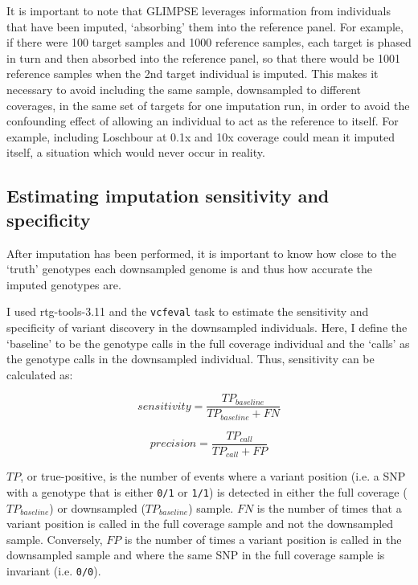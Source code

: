 It is important to note that GLIMPSE leverages information from individuals that have been imputed, `absorbing' them into the reference panel. For example, if there were 100 target samples and 1000 reference samples, each target is phased in turn and then absorbed into the reference panel, so that there would be 1001 reference samples when the 2nd target individual is imputed. This makes it necessary to avoid including the same sample, downsampled to different coverages, in the same set of targets for one imputation run, in order to avoid the confounding effect of allowing an individual to act as the reference to itself. For example, including Loschbour at 0.1x and 10x coverage could mean it imputed itself, a situation which would never occur in reality. 

\subsection{Estimating imputation sensitivity and specificity}

After imputation has been performed, it is important to know how close to the `truth' genotypes each downsampled genome is and thus how accurate the imputed genotypes are. 

I used rtg-tools-3.11 \cite{cleary2014joint} and the \texttt{vcfeval} task to estimate the sensitivity and specificity of variant discovery in the downsampled individuals. Here, I define the `baseline' to be the genotype calls in the full coverage individual and the `calls' as the genotype calls in the downsampled individual. Thus, sensitivity can be calculated as: 

\begin{equation}
sensitivity = \frac{TP_{baseline}}{TP_{baseline} + FN}
\end{equation}

\begin{equation}
precision = \frac{TP_{call}}{TP_{call} + FP}
\end{equation}


$TP$, or true-positive, is the number of events where a variant position (i.e. a SNP with a genotype that is either \texttt{0/1} or \texttt{1/1}) is detected in either the full coverage ($TP_{baseline}$) or downsampled ($TP_{baseline}$) sample. $FN$ is the number of times that a variant position is called in the full coverage sample and not the downsampled sample. Conversely, $FP$ is the number of times a variant position is called in the downsampled sample and where the same SNP in the full coverage sample is invariant (i.e. \texttt{0/0}). 

